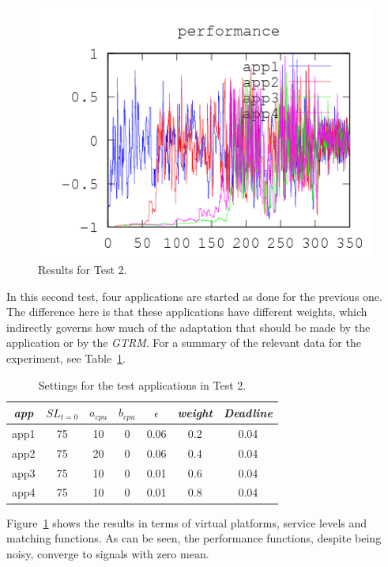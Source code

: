 \documentclass[nobiblatex]{LTHthesis}
\begin{document}
\begin{figure}[th]
\begin{minipage}{0.49\textwidth}
  \includegraphics[width=\textwidth]{"tools/plot/logs/test2/f"}
  \end{minipage}
\caption{Results for Test 2.}
\label{fig:test2}
\end{figure}

In this second test, four applications are started as done for the previous
one. The difference here is that these applications have different weights,
which indirectly governs how much of the adaptation that should be made by 
the application or by the \emph{GTRM}. 
For a summary of the relevant data for the experiment, see 
Table~\ref{tab:settings_test2}.

\begin{table}[h!]
  \centering
  \begin{tabular}{|c|c|c|c|c|c|c|}
 	\hline 
   \emph{app} & $SL_{t=0}$ & \textbf{$a_{cpu}$} & 
   \textbf{$b_{cpu}$} & \textbf{$\epsilon$} & \emph{weight} & 
   \emph{Deadline} \\ \hline
	app1 & 75 & 10 & 0 & 0.06 & 0.2 &0.04  \\ \hline
	app2 & 75 & 20 & 0 & 0.06 & 0.4 &0.04  \\ \hline
	app3 & 75 & 10 & 0 & 0.01 & 0.6 &0.04  \\ \hline
	app4 & 75 & 10 & 0 & 0.01 & 0.8 &0.04  \\ \hline		
  \end{tabular}
  \caption{Settings for the test applications in Test 2.}
  \label{tab:settings_test2}
\end{table}

Figure~\ref{fig:test2} shows the results in terms of virtual platforms,
service levels and matching functions. As can be seen, the performance
functions, despite being noisy, converge to signals with zero mean.
\end{document}
